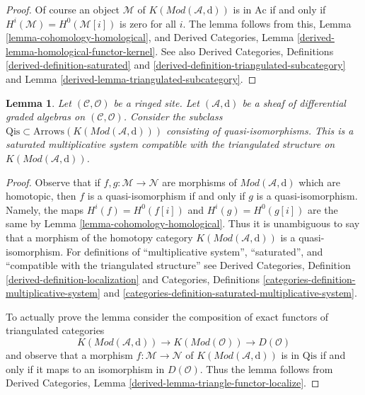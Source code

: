 \documentclass{stacks-project}
\theoremstyle{plain}
\newtheorem{lemma}[subsection]{Lemma}
\theoremstyle{definition}
\theoremstyle{remark}
\numberwithin{equation}{subsection}
\begin{document}
\begin{proof}
Of course an object $\mathcal{M}$ of $K(\textit{Mod}(\mathcal{A}, \text{d}))$
is in $\text{Ac}$ if and only if $H^i(\mathcal{M}) = H^0(\mathcal{M}[i])$
is zero for all $i$. The lemma follows from this,
Lemma \ref{lemma-cohomology-homological}, and
Derived Categories, Lemma \ref{derived-lemma-homological-functor-kernel}.
See also Derived Categories, Definitions \ref{derived-definition-saturated}
and \ref{derived-definition-triangulated-subcategory} and
Lemma \ref{derived-lemma-triangulated-subcategory}.
\end{proof}

\begin{lemma}
\label{lemma-qis}
Let $(\mathcal{C}, \mathcal{O})$ be a ringed site. Let
$(\mathcal{A}, \text{d})$ be a sheaf of differential graded algebras
on $(\mathcal{C}, \mathcal{O})$.
Consider the subclass
$\text{Qis} \subset \text{Arrows}(K(\textit{Mod}(\mathcal{A}, \text{d})))$
consisting of quasi-isomorphisms. This is a saturated multiplicative
system compatible with the triangulated structure on
$K(\textit{Mod}(\mathcal{A}, \text{d}))$.
\end{lemma}

\begin{proof}
Observe that if $f , g : \mathcal{M} \to \mathcal{N}$ are morphisms
of $\textit{Mod}(\mathcal{A}, \text{d})$ which are homotopic,
then $f$ is a quasi-isomorphism if and only if $g$ is a quasi-isomorphism.
Namely, the maps $H^i(f) = H^0(f[i])$ and $H^i(g) = H^0(g[i])$ are
the same by Lemma \ref{lemma-cohomology-homological}. Thus it is
unambiguous to say that a morphism of the homotopy category
$K(\textit{Mod}(\mathcal{A}, \text{d}))$ is a quasi-isomorphism.
For definitions of ``multiplicative system'', ``saturated'', and
``compatible with the triangulated structure'' see
Derived Categories, Definition \ref{derived-definition-localization}
and
Categories, Definitions \ref{categories-definition-multiplicative-system}
and \ref{categories-definition-saturated-multiplicative-system}.

\medskip\noindent
To actually prove the lemma consider the composition
of exact functors of triangulated categories
$$
K(\textit{Mod}(\mathcal{A}, \text{d}))
\longrightarrow
K(\textit{Mod}(\mathcal{O}))
\longrightarrow
D(\mathcal{O})
$$
and observe that a morphism $f : \mathcal{M} \to \mathcal{N}$
of $K(\textit{Mod}(\mathcal{A}, \text{d}))$ is in $\text{Qis}$
if and only if it maps to an isomorphism in $D(\mathcal{O})$.
Thus the lemma follows from Derived Categories, Lemma
\ref{derived-lemma-triangle-functor-localize}.
\end{proof}
\end{document}
